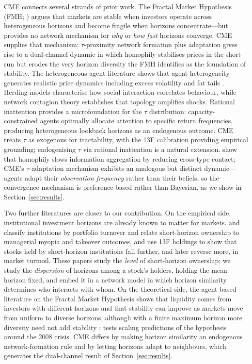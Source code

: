 \documentclass[preprint,12pt,authoryear]{elsarticle}
\begin{document}
CME connects several strands of prior work.
The Fractal Market Hypothesis (FMH; \citealt{peters1994}) argues that markets are
stable when investors operate across heterogeneous horizons and become
fragile when horizons concentrate---but provides no network mechanism for
\emph{why} or \emph{how fast} horizons converge.
CME supplies that mechanism: $\tau$-proximity network formation plus
adaptation gives rise to a dual-channel dynamic in which homophily
stabilises prices in the short run but erodes the very horizon diversity
the FMH identifies as the foundation of stability.
The heterogeneous-agent literature \citep{arthur1997, lebaron2001} shows
that agent heterogeneity generates realistic price dynamics including excess
volatility and fat tails \citep{cont2001}.
Herding models \citep{bikhchandani1992, devenow1996} characterise how
social interaction correlates behaviour, while network contagion theory
\citep{acemoglu2015} establishes that topology amplifies shocks.
Rational inattention \citep{sims2003, caplin2015} provides a
microfoundation for the $\tau$ distribution: capacity-constrained agents
optimally allocate attention to specific return frequencies, producing
heterogeneous lookback horizons as an endogenous outcome.
CME treats $\tau$ as exogenous for tractability, with the 13F calibration
providing empirical grounding; endogenising $\tau$ via rational inattention
is a natural extension.
\citet{golub2012} show that homophily slows information aggregation by
reducing cross-type contact; CME's $\tau$-adaptation mechanism exhibits an
analogous but distinct dynamic---agents adapt their \emph{observation
frequency} rather than their beliefs, so the convergence mechanism is
preference-based rather than Bayesian, as we show in
Section~\ref{sec:results}.

Two further literatures are closer to our contribution.
On the empirical side, institutional investment horizons are already known to
matter for markets.
\citet{bushee1998} and \citet{gaspar2005} classify institutions by portfolio
turnover and relate short-horizon ownership to managerial myopia and takeover
outcomes, and \citet{cella2013} use 13F holdings to show that stocks held by
short-horizon institutions fall further, and later reverse more, in market
turmoil.
These papers study the \emph{level} of short-horizon ownership; we study the
\emph{dispersion} of horizons among a stock's holders, holding the mean horizon
fixed, and embed it in a network model in which horizon similarity determines
who interacts with whom.
On the theoretical side, the agent-based literature on the Fractal Market
Hypothesis shows that liquidity comes from investors with different horizons
and that stability can improve as markets move from uniform to diverse horizons,
although with a finite maximum horizon more diversity need not add stability
\citep{li2014}; \citet{kristoufek2012} tests scaling predictions of the
hypothesis around the 2008 crisis.
CME differs by making horizon similarity an endogenous network-formation rule
and by letting horizons adapt to neighbours, which generates the dual-channel
result of Section~\ref{sec:results}.
\end{document}
